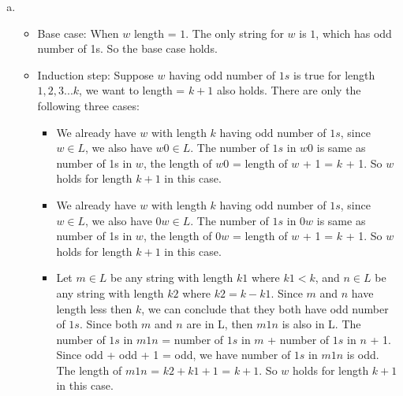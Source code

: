 \documentclass[11pt]{article}
\begin{document}
\begin{solution}
\item 
\begin{enumerate}[(a)]
\item
\begin{itemize}
\item
    Base case: When $w$ length = $1$. The only string for $w$ is $1$, which has odd number of 1s. So the base case holds.
\item
    Induction step: Suppose $w$ having odd number of $1s$ is true for length $1,2,3...k$, we want to length = $k+1$ also holds. There are only the following three cases:
    \begin{itemize}
    \item  
        We already have $w$ with length $k$ having odd number of $1s$, since $w \in L$, we also have $w0 \in L$. The number of $1s$ in $w0$ is same as number of 1s in $w$, the length of $w0$ = length of $w$ + 1 = $k$ + 1. So $w$ holds for length $k+1$ in this case.
    \item  
        We already have $w$ with length $k$ having odd number of $1s$, since $w \in L$, we also have $0w \in L$. The number of $1s$ in $0w$ is same as number of 1s in $w$, the length of $0w$ = length of $w$ + 1 = $k$ + 1. So $w$ holds for length $k+1$ in this case.
    \item  
        Let $m \in  L$ be any string with length $k1$ where $k1 < k$, and $n \in L$ be any string with length $k2$ where $k2 = k - k1$. Since $m$ and $n$ have length less then $k$, we can conclude that they both have odd number of $1s$. Since both $m$ and $n$ are in L, then $m1n$ is also in L. The number of $1s$ in $m1n$ = number of $1s$ in $m$ + number of $1s$ in $n$ + 1. Since odd + odd + 1 = odd, we have number of $1s$ in $m1n$ is odd. The length of $m1n$ = $k2 + k1 + 1$ = $k + 1$. So $w$ holds for length $k+1$ in this case.  
     

\end{itemize}
\end{itemize}
\end{enumerate}
\end{solution}
\end{document}
